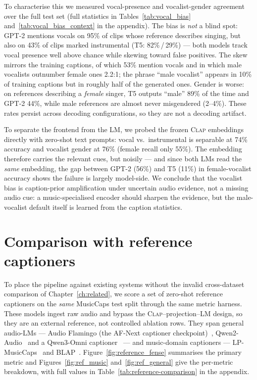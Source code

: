 \documentclass[9pt]{report}
\newcommand{\clapenc}{\textsc{Clap}}
\begin{document}
To characterise this we measured vocal-presence and vocalist-gender agreement over the full
test set (full statistics in Tables~\ref{tab:vocal_bias} and~\ref{tab:vocal_bias_context} in
the appendix). The bias is \emph{not} a blind spot: GPT-2 mentions vocals on 95\% of clips whose
reference describes singing, but also on 43\% of clips marked instrumental (T5: 82\%\,/\,29\%)
--- both models track vocal presence well above chance while skewing toward false positives.
The skew mirrors the training captions, of which 53\% mention vocals and in which male
vocalists outnumber female ones 2.2:1; the phrase ``male vocalist'' appears in 10\% of training
captions but in roughly half of the generated ones. Gender is worse: on references describing a
\emph{female} singer, T5 outputs ``male'' 89\% of the time and GPT-2 44\%, while male
references are almost never misgendered (2--4\%). These rates persist across decoding
configurations, so they are not a decoding artifact.

To separate the frontend from the LM, we probed the frozen \clapenc{} embeddings directly with
zero-shot text prompts: vocal vs.\ instrumental is separable at 74\% accuracy and vocalist
gender at 76\% (female recall only 55\%). The embedding therefore carries the relevant cues,
but noisily --- and since both LMs read the \emph{same} embedding, the gap between GPT-2
(56\%) and T5 (11\%) in female-vocalist accuracy shows the failure is largely model-side. We
conclude that the vocalist bias is caption-prior amplification under uncertain audio evidence,
not a missing audio cue: a music-specialised encoder should sharpen the evidence, but the
male-vocalist default itself is learned from the caption statistics.



\FloatBarrier
\section{Comparison with reference captioners}\label{sec:reference}
To place the pipeline against existing systems without the invalid cross-dataset comparison of
Chapter~\ref{ch:related}, we score a set of zero-shot reference captioners on the \emph{same}
MusicCaps test split through the same metric harness. These models ingest raw audio and bypass
the \clapenc{}--projection--LM design, so they are an external reference, not controlled ablation
rows. They span general audio-LMs --- Audio Flamingo (the AF-Next captioner
checkpoint)~\cite{ghosh2026afnext}, Qwen2-Audio~\cite{chu2024qwen2audio} and a Qwen3-Omni
captioner~\cite{xu2025qwen3omni} --- and
music-domain captioners --- LP-MusicCaps~\cite{doh2023lpmusiccaps} and
BLAP~\cite{lanzendorfer2025blap}. Figure~\ref{fig:reference_fense} summarises the primary
metric and Figures~\ref{fig:ref_music} and~\ref{fig:ref_general} give the per-metric
breakdown, with full values in Table~\ref{tab:reference-comparison} in the appendix.
\end{document}
